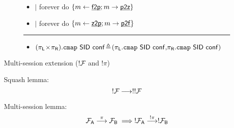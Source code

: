 \begin{figure}[h!]
\begin{boxedminipage}{\columnwidth}
\begin{small}
\begin{itemize}[leftmargin=2mm]
\item[] $|$ forever do $\{m \leftarrow \chan{f2p}; m \rightarrow \chan{p2z} \}$
\item[] $|$ forever do $\{m \leftarrow \chan{z2p}; m \rightarrow \chan{p2f} \}$
\end{itemize}
\end{small}
\hrule
\small
\begin{itemize}[leftmargin=2mm]
\item[] $(\pi_\msf{L}\!\times\!\pi_\msf{R}).\mtt{cmap}~\msf{SID}~ \msf{conf}\!\triangleq\!(
\pi_\msf{L}.\mtt{cmap}~\msf{SID}~\msf{conf},\!
\pi_\msf{R}.\mtt{cmap}~\msf{SID}~\msf{conf})$
\end{itemize}
\end{boxedminipage}
\end{figure}


\begin{theorem}

\begin{prooftree}
\end{prooftree}
\end{theorem}

Multi-session extension ($!\F{}$ and $!\pi$)

Squash lemma:
\[
 !\F{} \longrightarrow !!\F{}
\]

Multi-session lemma:
\[ 
\F{A} \overset{\pi}{\longrightarrow} \F{B}
\implies
!\F{A} \overset{!\pi}{\longrightarrow} !\F{B} 
\]

